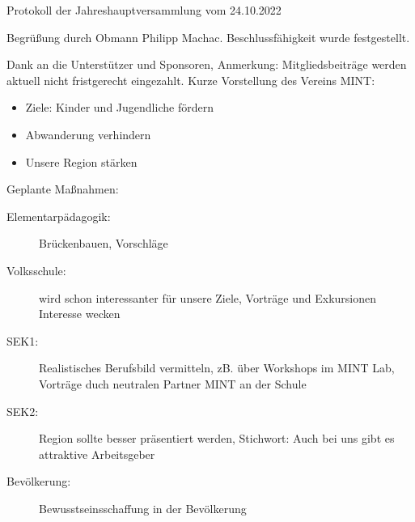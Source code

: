 \documentclass{scrartcl}
\newcommand\vereinName{Träger und Förderverein Mint Oberland}
\newcommand\obmann{Philipp Machac}
\begin{document}
\begin{Minutes}{Protokoll der Jahreshauptversammlung vom 24.10.2022}

  \subtitle{\vereinName}
  \moderation{\obmann}

  \maketitle
  \newpage

  Begrüßung durch Obmann \obmann.
  Beschlussfähigkeit wurde festgestellt.



  Dank an die Unterstützer und Sponsoren, Anmerkung: Mitgliedsbeiträge werden aktuell nicht fristgerecht eingezahlt.
  Kurze Vorstellung des Vereins MINT:
  \begin{itemize}
    \item Ziele: Kinder und Jugendliche fördern
    \item Abwanderung verhindern
    \item Unsere Region stärken
  \end{itemize}
  Geplante Maßnahmen:
  \begin{description}
    \item [Elementarpädagogik:] Brückenbauen, Vorschläge
    \item [Volksschule:] wird schon interessanter für unsere Ziele, Vorträge und Exkursionen Interesse wecken
    \item [SEK1:] Realistisches Berufsbild vermitteln, zB. über Workshops im MINT Lab, Vorträge duch neutralen Partner MINT an der Schule
    \item [SEK2:] Region sollte besser präsentiert werden, Stichwort: \glqq Auch bei uns gibt es attraktive Arbeitsgeber\grqq{}
    \item [Bevölkerung:] Bewusstseinsschaffung in der Bevölkerung
  \end{description}


\end{Minutes}
\end{document}
